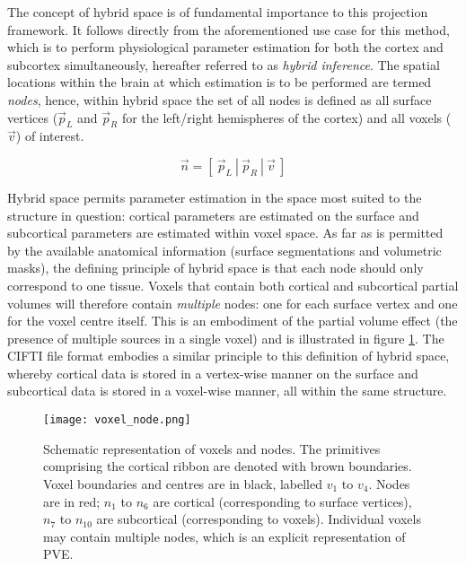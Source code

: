 The concept of hybrid space is of fundamental importance to this projection framework. It follows directly from the aforementioned use case for this method, which is to perform physiological parameter estimation for both the cortex and subcortex simultaneously, hereafter referred to as \textit{hybrid inference}. The spatial locations within the brain at which estimation is to be performed are termed \textit{nodes}, hence, within hybrid space the set of all nodes is defined as all surface vertices ($\vec{p}_L$ and $\vec{p}_R$ for the left/right hemispheres of the cortex) and all voxels ($\vec{v}$) of interest. 

\begin{equation}
\vec{n} = [\ \vec{p}_L \ | \ \vec{p}_R \ | \ \vec{v} \ ] 
\end{equation} 

Hybrid space permits parameter estimation in the space most suited to the structure in question: cortical parameters are estimated on the surface and subcortical parameters are estimated within voxel space. As far as is permitted by the available anatomical information (surface segmentations and volumetric masks), the defining principle of hybrid space is that each node should only correspond to one tissue. Voxels that contain both cortical and subcortical partial volumes will therefore contain \textit{multiple} nodes: one for each surface vertex and one for the voxel centre itself. This is an embodiment of the partial volume effect (the presence of multiple sources in a single voxel) and is illustrated in figure \ref{voxel_node}. The CIFTI file format \cite{cifti} embodies a similar principle to this definition of hybrid space, whereby cortical data is stored in a vertex-wise manner on the surface and subcortical data is stored in a voxel-wise manner, all within the same structure.

\begin{figure}
\centering
\texttt{[image: voxel\_node.png]}
\caption{Schematic representation of voxels and nodes. The primitives comprising the cortical ribbon are denoted with brown boundaries. Voxel boundaries and centres are in black, labelled $v_1$ to $v_4$. Nodes are in red; $n_1$ to $n_6$ are cortical (corresponding to surface vertices), $n_7$ to $n_{10}$ are subcortical (corresponding to voxels). Individual voxels may contain multiple nodes, which is an explicit representation of PVE.}
\label{voxel_node} 
\end{figure}


